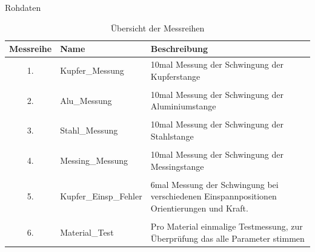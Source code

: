 \documentclass[twoside]{protokoll}
\begin{document}
\begin{aufgabe}{Rohdaten}
    \begin{table}[H]
        \centering
        \begin{tabularx}{1\textwidth}{c X X} 
            \toprule
            \textbf{Messreihe} & \textbf{Name} & \textbf{Beschreibung} \\
            \midrule
            1. & Kupfer\_Messung & 10mal Messung der Schwingung der Kupferstange \\\\
            2. & Alu\_Messung & 10mal Messung der Schwingung der Aluminiumstange \\\\
            3. & Stahl\_Messung & 10mal Messung der Schwingung der Stahlstange \\\\
            4. & Messing\_Messung & 10mal Messung der Schwingung der Messingstange \\\\
            5. & Kupfer\_Einsp\_Fehler & 6mal Messung der Schwingung bei verschiedenen 				Einspannpositionen Orientierungen und Kraft.  \\\\  
            6. & Material\_Test & Pro Material einmalige Testmessung, zur Überprüfung das alle Parameter stimmen \\
            \bottomrule
        \end{tabularx}
        \caption{Übersicht der Messreihen}
        \label{tab:mytable}
    \end{table}


\end{aufgabe}
\end{document}
